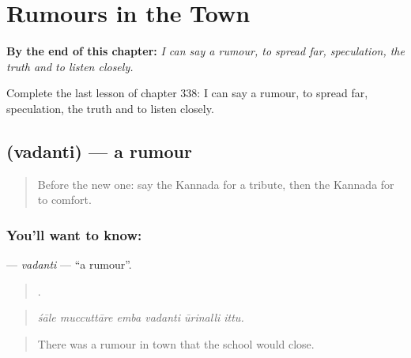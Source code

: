 
\chapter{Rumours in the Town}
\label{ch:ka-rumours-in-the-town}

\begin{chapteropening}
\textbf{By the end of this chapter:} \emph{I can say a rumour, to spread far, speculation, the truth and to listen closely.}

Complete the last lesson of chapter 338: I can say a rumour, to spread far, speculation, the truth and to listen closely.
\end{chapteropening}

\section[\texorpdfstring{\kn{ವದಂತಿ} (vadanti)}{ವದಂತಿ (vadanti)}]{ (vadanti) — a rumour}

\label{lesson:KA-C338-vadanti}



\begin{quote}
Before the new one: say the Kannada for a tribute, then the Kannada for to comfort.
\end{quote}

\subsection*{You'll want to know: }
\textbf{} — \emph{vadanti} — \textquotedblleft{}a rumour\textquotedblright{}.

\begin{quote}
     .
\end{quote}

\begin{quote}
\emph{śāle muccuttāre emba vadanti ūrinalli ittu.}
\end{quote}

\begin{quote}
There was a rumour in town that the school would close.
\end{quote}

